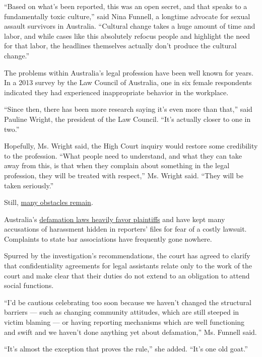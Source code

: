 ``Based on what's been reported, this was an open secret, and that
speaks to a fundamentally toxic culture,'' said Nina Funnell, a longtime
advocate for sexual assault survivors in Australia. ``Cultural change
takes a huge amount of time and labor, and while cases like this
absolutely refocus people and highlight the need for that labor, the
headlines themselves actually don't produce the cultural change.''

The problems within Australia's legal profession have been well known
for years. In a 2013 survey by the Law Council of Australia, one in six
female respondents indicated they had experienced inappropriate behavior
in the workplace.

``Since then, there has been more research saying it's even more than
that,'' said Pauline Wright, the president of the Law Council. ``It's
actually closer to one in two.''

Hopefully, Ms. Wright said, the High Court inquiry would restore some
credibility to the profession. ``What people need to understand, and
what they can take away from this, is that when they complain about
something in the legal profession, they will be treated with respect,''
Ms. Wright said. ``They will be taken seriously.''

Still,
\href{https://www.nytimes.com/2019/05/01/business/australia-sexual-harassment-nondisclosure-agreement.html}{many
obstacles remain}.

Australia's
\href{https://www.nytimes.com/2019/06/05/world/australia/journalist-raids.html}{defamation
laws heavily favor plaintiffs} and have kept many accusations of
harassment hidden in reporters' files for fear of a costly lawsuit.
Complaints to state bar associations have frequently gone nowhere.

Spurred by the investigation's recommendations, the court has agreed to
clarify that confidentiality agreements for legal assistants relate only
to the work of the court and make clear that their duties do not extend
to an obligation to attend social functions.

``I'd be cautious celebrating too soon because we haven't changed the
structural barriers --- such as changing community attitudes, which are
still steeped in victim blaming --- or having reporting mechanisms which
are well functioning and swift and we haven't done anything yet about
defamation,'' Ms. Funnell said.

``It's almost the exception that proves the rule,'' she added. ``It's
one old goat.''

